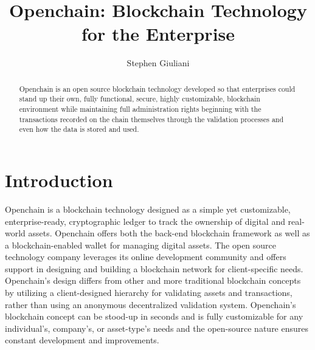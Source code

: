 \title{Openchain: Blockchain Technology for the Enterprise}


\author{Stephen Giuliani}

\renewcommand{\shortauthors}{S. Giuliani}

\begin{abstract}
Openchain is an open source blockchain technology developed so that enterprises could stand up their own, fully functional, secure, highly customizable, blockchain environment while maintaining full administration rights beginning with the transactions recorded on the chain themselves through the validation processes and even how the data is stored and used.
\end{abstract}


\maketitle

\section{Introduction}
Openchain is a blockchain technology designed as a simple yet customizable, enterprise-ready, cryptographic ledger to track the ownership of digital and real-world assets. Openchain offers both the back-end blockchain framework as well as a blockchain-enabled wallet for managing digital assets. The open source technology company leverages its online development community and offers support in designing and building a blockchain network for client-specific needs. Openchain's design differs from other and more traditional blockchain concepts by utilizing a client-designed hierarchy for validating assets and transactions, rather than using an anonymous decentralized validation system. Openchain's blockchain concept can be stood-up in seconds and is fully customizable for any individual's, company's, or asset-type's needs and the open-source nature ensures constant development and improvements.

